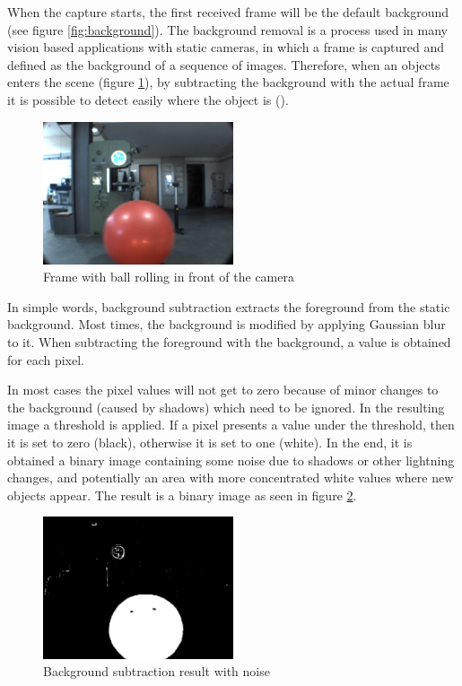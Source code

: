 When the capture starts, the first received frame will be the default background (see figure \ref{fig:background}). The background removal is a process used in many vision based applications with static cameras, in which a frame is captured and defined as the background of a sequence of images. Therefore, when an objects enters the scene (figure \ref{fig:balltest}), by subtracting the background with the actual frame it is possible to detect easily where the object is (\cite{OpenCV}).

\begin{figure}[htp]
	
	\centering
	\includegraphics[width=0.5\textwidth]{capcalib/imgs/ball_test.png}
	
	\caption{Frame with ball rolling in front of the camera}
	\label{fig:balltest}
	
\end{figure}

In simple words, background subtraction extracts the foreground from the static background. Most times, the background is modified by applying Gaussian blur to it. When subtracting the foreground with the background, a value is obtained for each pixel.

In most cases the pixel values will not get to zero because of minor changes to the background (caused by shadows) which need to be ignored. In the resulting image a threshold is applied. If a pixel presents a value under the threshold, then it is set to zero (black), otherwise it is set to one (white). In the end, it is obtained a binary image containing some noise due to shadows or other lightning changes, and potentially an area with more concentrated white values where new objects appear. The result is a binary image as seen in figure \ref{fig:ballnoise}.


\begin{figure}[htp]
	
	\centering
	\includegraphics[width=0.5\textwidth]{capcalib/imgs/noise.png}
	
	\caption{Background subtraction result with noise}
	\label{fig:ballnoise}
	
\end{figure}

